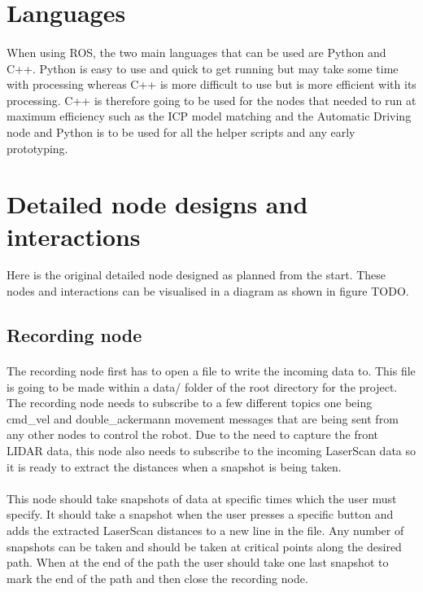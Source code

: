 \section{Languages}
\paragraph{}
When using ROS, the two main languages that can be used are Python and C++. Python is easy to use and quick to get running but may take some time with processing whereas C++ is more difficult to use but is more efficient with its processing. C++ is therefore going to be used for the nodes that needed to run at maximum efficiency such as the ICP model matching and the Automatic Driving node and Python is to be used for all the helper scripts and any early prototyping.

\section{Detailed node designs and interactions}
Here is the original detailed node designed as planned from the start. These nodes and interactions can be visualised in a diagram as shown in figure TODO.
\subsection{Recording node}
\paragraph{}
The recording node first has to open a file to write the incoming data to. This file is going to be made within a data/ folder of the root directory for the project. The recording node needs to subscribe to a few different topics one being cmd\_vel and double\_ackermann movement messages that are being sent from any other nodes to control the robot. Due to the need to capture the front LIDAR data, this node also needs to subscribe to the incoming LaserScan data so it is ready to extract the distances when a snapshot is being taken.
\paragraph{}
This node should take snapshots of data at specific times which the user must specify. It should take a snapshot when the user presses a specific button and adds the extracted LaserScan distances to a new line in the file. Any number of snapshots can be taken and should be taken at critical points along the desired path. When at the end of the path the user should take one last snapshot to mark the end of the path and then close the recording node.
